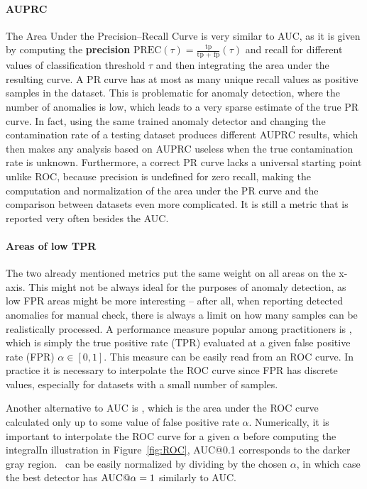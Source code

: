 \paragraph{AUPRC}
The Area Under the Precision--Recall Curve is very similar to AUC, as it is given by computing the \textbf{precision} $\text{PREC}(\tau)=\frac{\text{tp}}{\text{tp + fp}}(\tau)$ and recall for different values of classification threshold $\tau$ and then integrating the area under the resulting curve. A PR curve has at most as many unique recall values as positive samples in the dataset. This is problematic for anomaly detection, where the number of anomalies is low, which leads to a very sparse estimate of the true PR curve. In fact, using the same trained anomaly detector and changing the contamination rate of a testing dataset produces different AUPRC results, which then makes any analysis based on AUPRC useless when the true contamination rate is unknown. Furthermore, a correct PR curve lacks a universal starting point unlike ROC, because precision is undefined for zero recall, making the computation and normalization of the area under the PR curve and the comparison between datasets even more complicated. It is still a metric that is reported very often besides the AUC.

\paragraph{Areas of low TPR}
The two already mentioned metrics put the same weight on all areas on the x-axis. This might not be always ideal for the purposes of anomaly detection, as low FPR areas might be more interesting -- after all, when reporting detected anomalies for manual check, there is always a limit on how many samples can be realistically processed. A performance measure popular among practitioners is \textbf{\tpra}, which is simply the true positive rate (TPR) evaluated at a given false positive rate (FPR) $\alpha \in [0,1]$. This measure can be easily read from an ROC curve. In practice it is necessary to interpolate the ROC curve since FPR has discrete values, especially for datasets with a small number of samples. 

Another alternative to AUC is \textbf{\auca}, which is the area under the ROC curve calculated only up to some value of false positive rate $\alpha$. Numerically, it is important to interpolate the ROC curve for a given $\alpha$ before computing the integralIn illustration in Figure~\ref{fig:ROC}, AUC@0.1 corresponds to the darker gray region. \auca\ can be easily normalized by dividing by the chosen $\alpha$, in which case the best detector has $\textrm{AUC@}\alpha = 1$ similarly to AUC.


